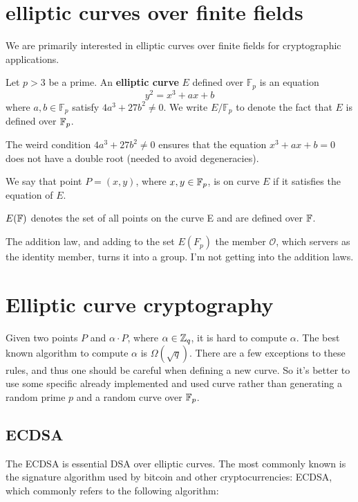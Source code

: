 \section{elliptic curves over finite fields}
We are primarily interested in elliptic curves over finite fields for cryptographic applications.
\begin{defn}
  Let $p >3 $ be a prime. An \textbf{elliptic curve} $E$ defined over $\mathbb{F}_p$ is an 
  equation  
  $$ y^2 = x^3 +ax + b$$
  where $a,b \in \mathbb{F}_p$ satisfy $4a^3 +27b^2 \neq 0$. We write $E/\mathbb{F}_p$ to denote
  the fact that $E$ is defined over $\mathbb{F}_p$.
\end{defn}
The weird condition $4a^3 +27b^2 \neq 0 $ ensures that the equation 
$ x^3 + ax + b = 0$ does not have a double root (needed to avoid degeneracies).

\begin{defn}
  We say that point $P=(x,y)$, where $x,y \in \mathbb{F}_p$, is on curve $E$ if it satisfies the equation of $E$.
\end{defn}
\begin{defn}
  $E(\mathbb{F})$ denotes the set of all points on the curve E and are defined over $\mathbb{F}$.
\end{defn}

The addition law, and adding to the set $E(F_p)$ the member $\mathcal{O}$,
 which servers as the identity member, turns it into a group. I'm not getting into the addition laws.

\section{Elliptic curve cryptography}


Given two points $P$ and $\alpha \cdot P$, where $\alpha \in \mathbb{Z}_q$, it is hard to compute $\alpha$.
The best known algorithm to compute $\alpha$ is $\Omega(\sqrt{q})$.
There are a few exceptions to these rules, and thus one should be careful when defining a new curve.
So it's better to use some specific already implemented and used curve rather than 
generating a random prime $p$ and a random curve over $\mathbb{F}_p$.

\subsection{ECDSA}
The ECDSA is essential DSA over elliptic curves.
The most commonly known is the signature algorithm used by bitcoin and other cryptocurrencies:
ECDSA, which commonly refers to the following algorithm:

